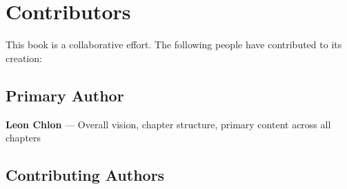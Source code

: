 
\chapter*{Contributors}

This book is a collaborative effort. The following people have contributed to its creation:

\section*{Primary Author}

\textbf{Leon Chlon} — Overall vision, chapter structure, primary content across all chapters

\section*{Contributing Authors}

\clearpage
